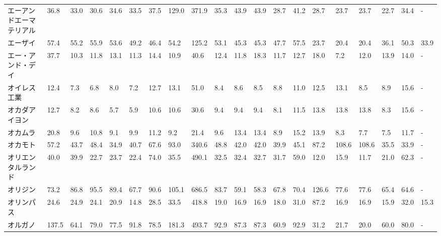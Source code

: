 \begin{longtable}[c]{lp{3mm}p{3mm}p{3mm}p{3mm}p{3mm}p{3mm}p{3mm}p{3mm}p{3mm}p{3mm}p{3mm}p{3mm}p{3mm}p{3mm}p{3mm}p{3mm}p{3mm}p{3mm}p{3mm}}
エーアンドエーマテリアル    &   36.8 &   33.0 &      30.6 &      34.6 &       33.5 &    37.5 &   129.0 &    371.9 &    35.3 &    43.9 &   43.9 &   28.7 &    41.2 &    28.7 &    23.7 &   23.7 &   22.7 &    34.4 &      - \\
エーザイ            &   57.4 &   55.2 &      55.9 &      53.6 &       49.2 &    46.4 &    54.2 &    125.2 &    53.1 &    45.3 &   45.3 &   47.7 &    57.5 &    23.7 &    20.4 &   20.4 &   36.1 &    50.3 &   33.9 \\
エー・アンド・デイ       &   37.7 &   10.3 &      11.8 &      13.1 &       11.3 &    14.4 &    10.9 &     40.6 &    12.4 &    11.8 &   18.3 &   11.7 &    12.7 &    18.0 &     7.2 &   12.0 &   13.9 &    14.0 &      - \\
オイレス工業          &   12.4 &    7.3 &       6.8 &       8.0 &        7.2 &    12.7 &    13.1 &     51.0 &     8.4 &     8.6 &    8.5 &    8.8 &    11.0 &    12.5 &    13.1 &    8.5 &    8.9 &    15.6 &      - \\
オカダアイヨン         &   12.7 &    8.2 &       8.6 &       5.7 &        5.9 &    10.6 &    10.6 &     30.6 &     9.4 &     9.4 &    9.4 &    8.1 &    11.5 &    13.8 &    13.8 &   13.8 &    8.3 &    15.6 &      - \\
オカムラ            &   20.8 &    9.6 &      10.8 &       9.1 &        9.9 &    11.2 &     9.2 &     21.4 &     9.6 &    13.4 &   13.4 &    8.9 &    15.2 &    13.9 &     8.3 &    7.7 &    7.5 &    11.7 &      - \\
オカモト            &   57.2 &   43.7 &      48.4 &      34.9 &       40.7 &    67.6 &    93.0 &    340.6 &    48.8 &    42.0 &   42.0 &   39.9 &    45.1 &    87.2 &   108.6 &  108.6 &   35.5 &    33.9 &      - \\
オリエンタルランド       &   40.0 &   39.9 &      22.7 &      23.7 &       22.4 &    74.0 &    35.5 &    490.1 &    32.5 &    32.4 &   32.7 &   31.7 &    59.0 &    12.0 &    15.9 &   11.7 &   21.0 &    62.3 &      - \\
オリジン            &   73.2 &   86.8 &      95.5 &      89.4 &       67.7 &    90.6 &   105.1 &    686.5 &    83.7 &    59.1 &   58.3 &   67.8 &    70.4 &   126.6 &    77.6 &   77.6 &   65.4 &    64.6 &      - \\
オリンパス           &   24.6 &   24.9 &      24.1 &      20.9 &       14.8 &    28.5 &    33.5 &    418.8 &    19.0 &    16.9 &   16.9 &   18.0 &    31.0 &    87.2 &    16.9 &   16.9 &   15.9 &    32.0 &   15.3 \\
オルガノ            &  137.5 &   64.1 &      79.0 &      77.5 &       91.8 &    78.5 &   181.3 &    493.7 &    92.9 &    87.3 &   87.3 &   60.9 &    92.9 &    31.2 &    21.7 &   20.0 &   60.0 &    80.0 &      - \\

\end{longtable}

